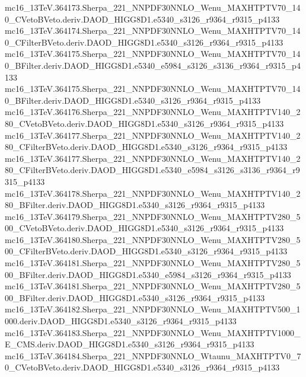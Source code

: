 \begin{scriptsize}
mc16\_13TeV.364173.Sherpa\_221\_NNPDF30NNLO\_Wenu\_MAXHTPTV70\_140\_CVetoBVeto.deriv.DAOD\_HIGG8D1.e5340\_s3126\_r9364\_r9315\_p4133 \\
mc16\_13TeV.364174.Sherpa\_221\_NNPDF30NNLO\_Wenu\_MAXHTPTV70\_140\_CFilterBVeto.deriv.DAOD\_HIGG8D1.e5340\_s3126\_r9364\_r9315\_p4133 \\
mc16\_13TeV.364175.Sherpa\_221\_NNPDF30NNLO\_Wenu\_MAXHTPTV70\_140\_BFilter.deriv.DAOD\_HIGG8D1.e5340\_e5984\_s3126\_s3136\_r9364\_r9315\_p4133 \\
mc16\_13TeV.364175.Sherpa\_221\_NNPDF30NNLO\_Wenu\_MAXHTPTV70\_140\_BFilter.deriv.DAOD\_HIGG8D1.e5340\_s3126\_r9364\_r9315\_p4133 \\
mc16\_13TeV.364176.Sherpa\_221\_NNPDF30NNLO\_Wenu\_MAXHTPTV140\_280\_CVetoBVeto.deriv.DAOD\_HIGG8D1.e5340\_s3126\_r9364\_r9315\_p4133 \\
mc16\_13TeV.364177.Sherpa\_221\_NNPDF30NNLO\_Wenu\_MAXHTPTV140\_280\_CFilterBVeto.deriv.DAOD\_HIGG8D1.e5340\_s3126\_r9364\_r9315\_p4133 \\
mc16\_13TeV.364177.Sherpa\_221\_NNPDF30NNLO\_Wenu\_MAXHTPTV140\_280\_CFilterBVeto.deriv.DAOD\_HIGG8D1.e5340\_e5984\_s3126\_s3136\_r9364\_r9315\_p4133 \\
mc16\_13TeV.364178.Sherpa\_221\_NNPDF30NNLO\_Wenu\_MAXHTPTV140\_280\_BFilter.deriv.DAOD\_HIGG8D1.e5340\_s3126\_r9364\_r9315\_p4133 \\
mc16\_13TeV.364179.Sherpa\_221\_NNPDF30NNLO\_Wenu\_MAXHTPTV280\_500\_CVetoBVeto.deriv.DAOD\_HIGG8D1.e5340\_s3126\_r9364\_r9315\_p4133 \\
mc16\_13TeV.364180.Sherpa\_221\_NNPDF30NNLO\_Wenu\_MAXHTPTV280\_500\_CFilterBVeto.deriv.DAOD\_HIGG8D1.e5340\_s3126\_r9364\_r9315\_p4133 \\
mc16\_13TeV.364181.Sherpa\_221\_NNPDF30NNLO\_Wenu\_MAXHTPTV280\_500\_BFilter.deriv.DAOD\_HIGG8D1.e5340\_e5984\_s3126\_r9364\_r9315\_p4133 \\
mc16\_13TeV.364181.Sherpa\_221\_NNPDF30NNLO\_Wenu\_MAXHTPTV280\_500\_BFilter.deriv.DAOD\_HIGG8D1.e5340\_s3126\_r9364\_r9315\_p4133 \\
mc16\_13TeV.364182.Sherpa\_221\_NNPDF30NNLO\_Wenu\_MAXHTPTV500\_1000.deriv.DAOD\_HIGG8D1.e5340\_s3126\_r9364\_r9315\_p4133 \\
mc16\_13TeV.364183.Sherpa\_221\_NNPDF30NNLO\_Wenu\_MAXHTPTV1000\_E\_CMS.deriv.DAOD\_HIGG8D1.e5340\_s3126\_r9364\_r9315\_p4133 \\
mc16\_13TeV.364184.Sherpa\_221\_NNPDF30NNLO\_Wtaunu\_MAXHTPTV0\_70\_CVetoBVeto.deriv.DAOD\_HIGG8D1.e5340\_s3126\_r9364\_r9315\_p4133 \\

\end{scriptsize}
